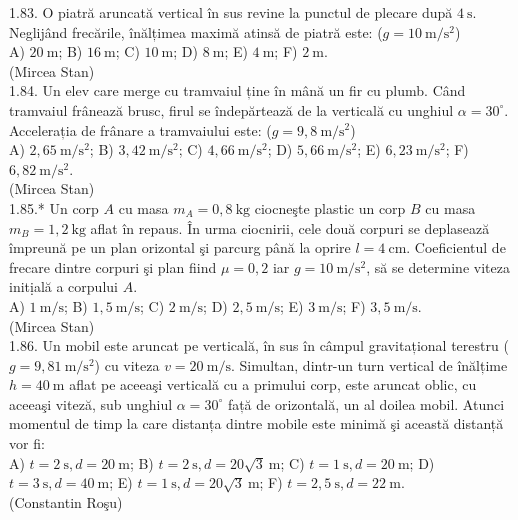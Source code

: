 1.83. O piatră aruncată vertical în sus revine la punctul de plecare după $4 \mathrm{~s}$. Neglijând frecările, înălțimea maximă atinsă de piatră este: ($g=10 \mathrm{~m} / \mathrm{s}^{2}$)\\ A) $20 \mathrm{~m}$; B) $16 \mathrm{~m}$; C) $10 \mathrm{~m}$; D) $8 \mathrm{~m}$; E) $4 \mathrm{~m}$; F) $2 \mathrm{~m}$.\\ (Mircea Stan)\\

1.84. Un elev care merge cu tramvaiul ține în mână un fir cu plumb. Când tramvaiul frânează brusc, firul se îndepărtează de la verticală cu unghiul $\alpha=30^{\circ}$. Accelerația de frânare a tramvaiului este: ($g=9,8 \mathrm{~m} / \mathrm{s}^{2}$)\\ A) $2,65 \mathrm{~m} / \mathrm{s}^{2}$; B) $3,42 \mathrm{~m} / \mathrm{s}^{2}$; C) $4,66 \mathrm{~m} / \mathrm{s}^{2}$; D) $5,66 \mathrm{~m} / \mathrm{s}^{2}$; E) $6,23 \mathrm{~m} / \mathrm{s}^{2}$; F) $6,82 \mathrm{~m} / \mathrm{s}^{2}$.\\ (Mircea Stan)\\

1.85.* Un corp $A$ cu masa $m_{A}=0,8 \mathrm{~kg}$ ciocneşte plastic un corp $B$ cu masa $m_{B}=1,2 \mathrm{~kg}$ aflat în repaus. În urma ciocnirii, cele două corpuri se deplasează împreună pe un plan orizontal şi parcurg până la oprire $l=4 \mathrm{~cm}$. Coeficientul de frecare dintre corpuri şi plan fiind $\mu=0,2$ iar $g=10 \mathrm{~m} / \mathrm{s}^{2}$, să se determine viteza initịală a corpului $A$.\\ A) $1 \mathrm{~m} / \mathrm{s}$; B) $1,5 \mathrm{~m} / \mathrm{s}$; C) $2 \mathrm{~m} / \mathrm{s}$; D) $2,5 \mathrm{~m} / \mathrm{s}$; E) $3 \mathrm{~m} / \mathrm{s}$; F) $3,5 \mathrm{~m} / \mathrm{s}$.\\ (Mircea Stan)\\

1.86. Un mobil este aruncat pe verticală, în sus în câmpul gravitațional terestru ($g=9,81 \mathrm{~m} / \mathrm{s}^{2}$) cu viteza $v=20 \mathrm{~m} / \mathrm{s}$. Simultan, dintr-un turn vertical de înălțime $h=40 \mathrm{~m}$ aflat pe aceeaşi verticală cu a primului corp, este aruncat oblic, cu aceeaşi viteză, sub unghiul $\alpha=30^{\circ}$ față de orizontală, un al doilea mobil. Atunci momentul de timp la care distanța dintre mobile este minimă şi această distanță vor fi:\\ A) $t=2 \mathrm{~s}, d=20 \mathrm{~m}$; B) $t=2 \mathrm{~s}, d=20 \sqrt{3} \mathrm{~m}$; C) $t=1 \mathrm{~s}, d=20 \mathrm{~m}$; D) $t=3 \mathrm{~s}, d=40 \mathrm{~m}$; E) $t=1 \mathrm{~s}, d=20 \sqrt{3} \mathrm{~m}$; F) $t=2,5 \mathrm{~s}, d=22 \mathrm{~m}$.\\ (Constantin Roşu)\\

